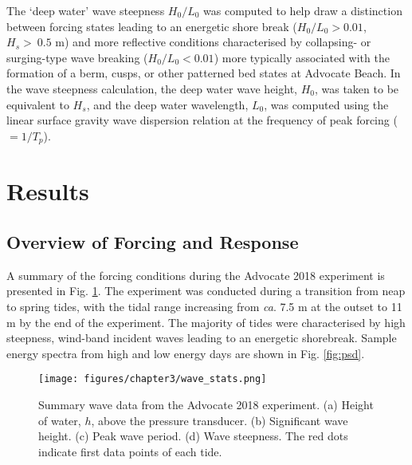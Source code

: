 The `deep water' wave steepness $H_0/L_0$ was computed to help draw a distinction between forcing states leading to an energetic shore break ($H_0/L_0 > 0.01$, $H_s > ~0.5$ m) and more reflective conditions characterised by collapsing- or surging-type wave breaking ($H_0/L_0 < 0.01$) more typically associated with the formation of a berm, cusps, or other patterned bed states at Advocate Beach. In the wave steepness calculation, the deep water wave height, $H_0$, was taken to be equivalent to $H_s$, and the deep water wavelength, $L_0$, was computed using the linear surface gravity wave dispersion relation at the frequency of peak forcing ($=1/T_p$).


\section{Results}\label{section:ch3_results}

\subsection{Overview of Forcing and Response}\label{subsection:beachMSD}



A summary of the forcing conditions during the Advocate 2018 experiment is presented in Fig. \ref{fig:wavestats}. The experiment was conducted during a transition from neap to spring tides, with the tidal range increasing from \textit{ca}. 7.5 m at the outset to 11 m by the end of the experiment. The majority of tides were characterised by high steepness, wind-band incident waves leading to an energetic shorebreak. Sample energy spectra from high and low energy days are shown in Fig. \ref{fig:psd}.

\begin{figure}[tbp] %
	\texttt{[image: figures/chapter3/wave\_stats.png]}
	\caption[Wave data: Advocate 2018 experiment]{Summary wave data from the Advocate 2018 experiment. (a) Height of water, $h$, above the pressure transducer. (b) Significant wave height. (c) Peak wave period. (d) Wave steepness. The red dots indicate first data points of each tide.} %
	\label{fig:wavestats}
\end{figure}

